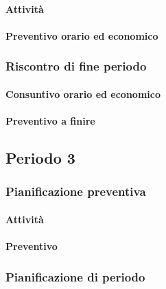 \paragraph{Attività}

\paragraph{Preventivo orario ed economico}



\subsubsection{Riscontro di fine periodo}


\paragraph{Consuntivo orario ed economico}


\paragraph{Preventivo a finire}






\subsection{Periodo 3}

\subsubsection{Pianificazione preventiva}

\paragraph{Attività}

\planningTable{
	
}

\paragraph{Preventivo}

\subsubsection{Pianificazione di periodo}




